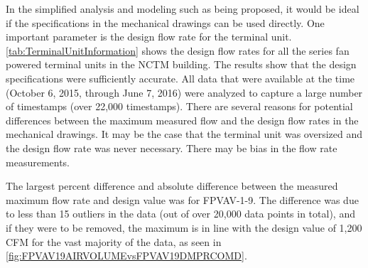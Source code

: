In the simplified analysis and modeling such as being proposed, it would be
ideal if the specifications in the mechanical drawings can be used
directly.  One important parameter is the design flow rate for the
terminal unit.  \tableref{} \ref{tab:TerminalUnitInformation} shows the
design flow rates for all the series fan powered terminal units in the
NCTM building.  The results show that the design specifications were
sufficiently accurate.  All data that were available at the time
(October 6, 2015, through June 7, 2016) were analyzed to capture a large
number of timestamps (over 22,000 timestamps).  There are several
reasons for potential differences between the maximum measured flow and
the design flow rates in the mechanical drawings.  It may be the case
that the terminal unit was oversized and the design flow rate was never
necessary. There may be bias in the flow rate measurements.  

The largest percent difference and absolute difference between the
measured maximum flow rate and design value was for FPVAV-1-9. The
difference was due to less than 15 outliers in the data (out of over
20,000 data points in total), and if they were to be removed, the
maximum is in line with the design value of 1,200 CFM for the vast
majority of the data, as seen in \figref{}
\ref{fig:FPVAV19AIRVOLUMEvsFPVAV19DMPRCOMD}. 

